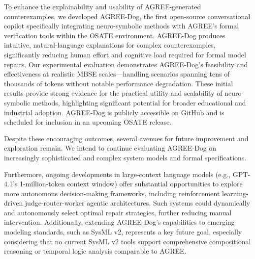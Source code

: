 \label{sec:limitations}


To enhance the explainability and usability of AGREE-generated counterexamples, we developed AGREE-Dog, the first open-source conversational copilot specifically integrating neuro-symbolic methods with AGREE's formal verification tools within the OSATE environment. AGREE-Dog produces intuitive, natural-language explanations for complex counterexamples, significantly reducing human effort and cognitive load required for formal model repairs. Our experimental evaluation demonstrates AGREE-Dog's feasibility and effectiveness at realistic MBSE scales—handling scenarios spanning tens of thousands of tokens without notable performance degradation. These initial results provide strong evidence for the practical utility and scalability of neuro-symbolic methods, highlighting significant potential for broader educational and industrial adoption. AGREE-Dog is publicly accessible on GitHub and is scheduled for inclusion in an upcoming OSATE release.

Despite these encouraging outcomes, several avenues for future improvement and exploration remain. We intend to continue evaluating AGREE-Dog on increasingly sophisticated and complex system models and formal specifications. %

Furthermore, ongoing developments in large-context language models (e.g., GPT-4.1’s 1-million-token context window) offer substantial opportunities to explore more autonomous decision-making frameworks, including reinforcement learning-driven judge-router-worker agentic architectures. Such systems could dynamically and autonomously select optimal repair strategies, further reducing manual intervention. Additionally, extending AGREE-Dog’s capabilities to emerging modeling standards, such as SysML v2, represents a key future goal, especially considering that no current SysML v2 tools support comprehensive compositional reasoning or temporal logic analysis comparable to AGREE.

